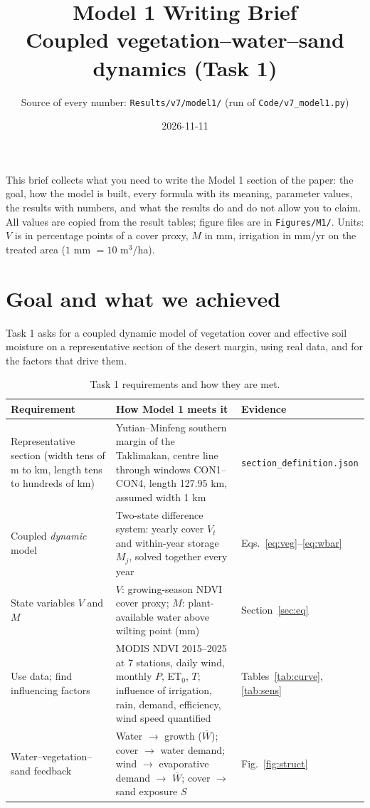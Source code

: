 \documentclass[11pt,a4paper]{article}
\title{\textbf{Model 1 Writing Brief}\\[2pt]\large Coupled vegetation--water--sand dynamics (Task 1)}
\author{Source of every number: \texttt{Results/v7/model1/} (run of \texttt{Code/v7\_model1.py})}
\date{2026-11-11}
\newcommand{\Wb}{\overline W}
\begin{document}
\sloppy
\maketitle

\noindent This brief collects what you need to write the Model 1 section of the paper:
the goal, how the model is built, every formula with its meaning, parameter values,
the results with numbers, and what the results do and do not allow you to claim.
All values are copied from the result tables; figure files are in \texttt{Figures/M1/}.
Units: $V$ is in percentage points of a cover proxy, $M$ in mm, irrigation in mm/yr on the
treated area ($1$ mm $=10$ m$^3$/ha).

\tableofcontents

\section{Goal and what we achieved}

Task 1 asks for a coupled dynamic model of vegetation cover and effective soil moisture on
a representative section of the desert margin, using real data, and for the factors that drive them.

\begin{table}[H]\centering\small
\begin{tabularx}{\textwidth}{@{}p{3.4cm}YY@{}}
\toprule
Requirement & How Model 1 meets it & Evidence \\
\midrule
Representative section (width tens of m to km, length tens to hundreds of km) &
Yutian--Minfeng southern margin of the Taklimakan, centre line through windows CON1--CON4, length 127.95 km, assumed width 1 km &
\texttt{section\_definition.json} \\
Coupled \emph{dynamic} model &
Two-state difference system: yearly cover $V_t$ and within-year storage $M_j$, solved together every year &
Eqs.~\eqref{eq:veg}--\eqref{eq:wbar} \\
State variables $V$ and $M$ &
$V$: growing-season NDVI cover proxy; $M$: plant-available water above wilting point (mm) &
Section~\ref{sec:eq} \\
Use data; find influencing factors &
MODIS NDVI 2015--2025 at 7 stations, daily wind, monthly $P$, ET$_0$, $T$; influence of irrigation, rain, demand, efficiency, wind speed quantified &
Tables~\ref{tab:curve}, \ref{tab:sens} \\
Water--vegetation--sand feedback &
Water $\to$ growth ($\Wb$); cover $\to$ water demand; wind $\to$ evaporative demand $\to$ $\Wb$; cover $\to$ sand exposure $S$ &
Fig.~\ref{fig:struct} \\
\bottomrule
\end{tabularx}
\caption{Task 1 requirements and how they are met.}
\end{table}
\end{document}
